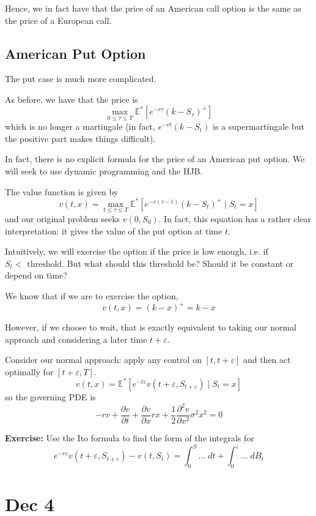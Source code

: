 \documentclass[12pt]{report}
\newcommand{\E}{\mathbb{E}}
\newcommand{\ep}{\varepsilon}
\newenvironment*{exercise}[1][red]{
    \begin{tcolorbox}[
        parbox=false,
        colback=#1!5!white,
        colframe=#1!75!black,
        breakable
    ]}
    {\end{tcolorbox}}
\begin{document}
    Hence, we in fact have that the price of an American call option is the same as the price of a European call.
     
\subsection*{American Put Option}
    The put case is much more complicated.

    As before, we have that the price is 
    \[\max_{0 \leq \tau \leq T} \E^*[e^{-r\tau}(k - S_{\tau})^+]\]
    which is no longer a martingale (in fact, $e^{-rt}(k - S_t)$ is a supermartingale but the positive part makes things difficult).

    In fact, there is no explicit formula for the price of an American put option. We will seek to use dynamic programming and the HJB. 

    The value function is given by 
    \[v(t, x) = \max_{t \leq \tau \leq T}\E^*[e^{-r(\tau - t)}(k - S_t)^+ \; | \; S_t = x]\]
    and our original problem seeks $v(0, S_0)$. In fact, this equation has a rather clear interpretation: it gives the value of the put option at time $t$. 

    Intuitively, we will exercise the option if the price is low enough, i.e. if $S_t < \text{ threshold}$. But what should this threshold be? Should it be constant or depend on time? 

    We know that if we are to exercise the option, 
    \[v(t, x) = (k - x)^+ = k -x\]

    However, if we choose to wait, that is exactly equivalent to taking our normal approach and considering a later time $t + \ep$.

    Consider our normal approach: apply any control on $[t, t + \ep]$ and then act optimally for $[t + \ep, T]$.
    \[v(t, x) = \E^*[e^{-t\ep} v(t + \ep, S_{t+\ep}) \; | \; S_t = x]\]
    so the governing PDE is 
    \[-rv + \frac{\partial v}{\partial t} + \frac{\partial v}{\partial x} rx + \frac{1}{2} \frac{\partial^2 v}{\partial x^2} \sigma^2 x^2 = 0\]

    \begin{exercise}
        \textbf{Exercise:} Use the Ito formula to find the form of the integrals for 
        \[e^{-r\ep} v(t + \ep, S_{t+\ep}) - v(t, S_t)= \int_0^S \dots \; dt + \int_0^{\ep} \dots\; dB_t\]
    \end{exercise}

\section{Dec 4}
\end{document}
